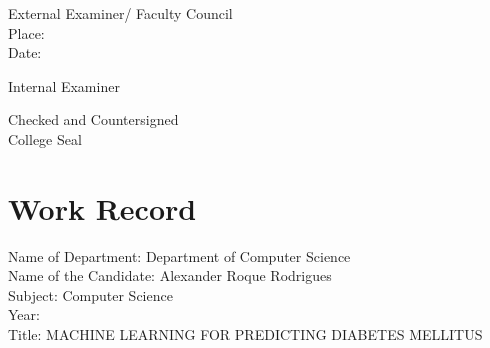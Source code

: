 \documentclass[12pt]{article}
\begin{document}
\endgroup
\vspace{4cm}
\begin{flushleft}
External Examiner/ Faculty Council\\
Place:\\
Date:\\
\end{flushleft}


\begin{flushright}\vspace{-2cm} Internal Examiner\end{flushright}

\vspace{5cm}
\begin{flushleft}
Checked and Countersigned\\
College Seal
\end{flushleft}



\clearpage
\newpage

\section{Work Record}
Name of Department: Department of Computer Science\\
Name of the Candidate: Alexander Roque Rodrigues\\
Subject: Computer Science\\
Year:\\
Title: MACHINE LEARNING FOR PREDICTING DIABETES MELLITUS\\
\end{document}
